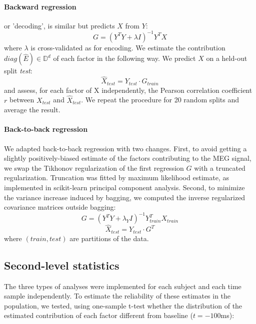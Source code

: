 \paragraph{Backward regression} or 'decoding', is similar but predicts $X$ from $Y$:
\begin{equation} G = (Y^{T}Y+\lambda I)^{-1} Y^{T}X \end{equation}
where $\lambda$ is cross-validated as for encoding. We estimate the
contribution $diag(\hat E) \in\mathbb{D}^{d} $ of each factor in the following
way. We predict $X$ on a held-out split \textit{test}:
\begin{equation} \hat X_{test} = Y_{test}\cdot G_{train} \end{equation}
and assess, for each factor of X independently, the Pearson correlation
coefficient $r$ between $X_{test}$ and $\hat X_{test}$. We repeat the procedure
for 20 random splits and average the result.

\paragraph{Back-to-back regression} We adapted back-to-back regression with two
changes. First, to avoid getting a slightly positively-biased estimate of the
factors contributing to the MEG signal, we swap the Tikhonov regularization of
the first regression $G$ with a truncated regularization. Truncation was fitted
 by maximum likelihood estimate, as implemented in scikit-learn principal
 component analysis. Second, to minimize the variance increase induced by
 bagging, we computed the inverse regularized covariance matrices outside
 bagging:
\begin{equation}
  G = (Y^T Y+\lambda_Y I)^{-1} Y_{train}^T X_{train}
\end{equation}
\begin{equation}
\hat X_{test} = Y_{test} \cdot G^T
\end{equation} where $\left(train,test\right)$ are partitions of the data.

\subsection{Second-level statistics}

The three types of analyses were implemented for each subject and each time
sample independently.  To estimate the reliability of these estimates in the
population, we tested, using one-sample t-test whether the distribution of the
estimated contribution of each factor different from baseline ($t=-100$ms):

